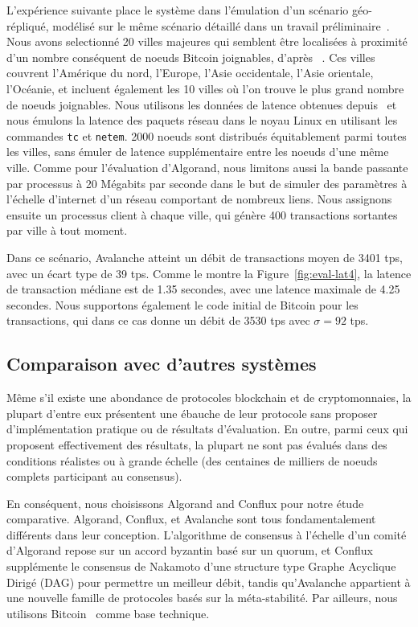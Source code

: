 L'expérience suivante place le système dans l'émulation d'un scénario géo-répliqué, modélisé sur le même scénario
détaillé dans un travail préliminaire~\cite{GiladHMVZ17}.
Nous avons selectionné 20 villes majeures qui semblent être localisées à proximité d'un nombre conséquent de noeuds
Bitcoin joignables, d'après ~\cite{bitnodes2018}. Ces villes couvrent l'Amérique du nord, l'Europe, l'Asie occidentale,
l'Asie orientale, l'Océanie, et incluent également les 10 villes où l'on trouve le plus grand nombre de noeuds
joignables. Nous utilisons les données de latence obtenues depuis~\cite{wondernetworkping2018} et nous émulons
la latence des paquets réseau dans le noyau Linux en utilisant les commandes \texttt{tc} et \texttt{netem}.
2000 noeuds sont distribués équitablement parmi toutes les villes, sans émuler de latence supplémentaire entre les
noeuds d'une même ville. Comme pour l'évaluation d'Algorand, nous limitons aussi la bande passante par processus
à 20 Mégabits par seconde dans le but de simuler des paramètres à l'échelle d'internet d'un réseau comportant de
nombreux liens. Nous assignons ensuite un processus client à chaque ville, qui génère 400 transactions sortantes
par ville à tout moment.

Dans ce scénario, Avalanche atteint un débit de transactions moyen de 3401 tps, avec un écart type de 39 tps. Comme
le montre la Figure~\ref{fig:eval-lat4}, la latence de transaction médiane est de 1.35 secondes, avec une latence
maximale de 4.25 secondes. Nous supportons également le code initial de Bitcoin pour les transactions, qui dans ce
cas donne un débit de 3530 tps avec $\sigma = 92$ tps.

\subsection{Comparaison avec d'autres systèmes}

Même s'il existe une abondance de protocoles blockchain et de cryptomonnaies, la plupart d'entre eux présentent
une ébauche de leur protocole sans proposer d'implémentation pratique ou de résultats d'évaluation. En outre, parmi
ceux qui proposent effectivement des résultats, la plupart ne sont pas évalués dans des conditions réalistes ou à
grande échelle (des centaines de milliers de noeuds complets participant au consensus).

En conséquent, nous choisissons Algorand and Conflux pour notre étude comparative. Algorand, Conflux, et Avalanche
sont tous fondamentalement différents dans leur conception. L'algorithme de consensus à l'échelle d'un comité
d'Algorand repose sur un accord byzantin basé sur un quorum, et Conflux supplémente le consensus de Nakamoto d'une
structure type Graphe Acyclique Dirigé (DAG) pour permettre un meilleur débit, tandis qu'Avalanche appartient à
une nouvelle famille de protocoles basés sur la méta-stabilité. Par ailleurs, nous utilisons
Bitcoin~\cite{nakamoto2008bitcoin} comme base technique.

